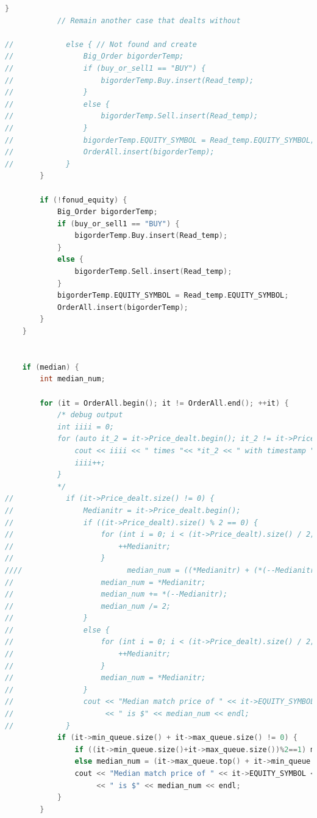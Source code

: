 \documentclass{article}
\begin{document}
\begin{lstlisting}[language=C++]
            }
            // Remain another case that dealts without

//            else { // Not found and create
//                Big_Order bigorderTemp;
//                if (buy_or_sell1 == "BUY") {
//                    bigorderTemp.Buy.insert(Read_temp);
//                }
//                else {
//                    bigorderTemp.Sell.insert(Read_temp);
//                }
//                bigorderTemp.EQUITY_SYMBOL = Read_temp.EQUITY_SYMBOL;
//                OrderAll.insert(bigorderTemp);
//            }
        }

        if (!fonud_equity) {
            Big_Order bigorderTemp;
            if (buy_or_sell1 == "BUY") {
                bigorderTemp.Buy.insert(Read_temp);
            }
            else {
                bigorderTemp.Sell.insert(Read_temp);
            }
            bigorderTemp.EQUITY_SYMBOL = Read_temp.EQUITY_SYMBOL;
            OrderAll.insert(bigorderTemp);
        }
    }


    if (median) {
        int median_num;

        for (it = OrderAll.begin(); it != OrderAll.end(); ++it) {
            /* debug output
            int iiii = 0;
            for (auto it_2 = it->Price_dealt.begin(); it_2 != it->Price_dealt.end(); it_2++) {
                cout << iiii << " times "<< *it_2 << " with timestamp " << timestamp << endl;
                iiii++;
            }
            */
//            if (it->Price_dealt.size() != 0) {
//                Medianitr = it->Price_dealt.begin();
//                if ((it->Price_dealt).size() % 2 == 0) {
//                    for (int i = 0; i < (it->Price_dealt).size() / 2; i++) {
//                        ++Medianitr;
//                    }
////                        median_num = ((*Medianitr) + (*(--Medianitr))) / 2;
//                    median_num = *Medianitr;
//                    median_num += *(--Medianitr);
//                    median_num /= 2;
//                }
//                else {
//                    for (int i = 0; i < (it->Price_dealt).size() / 2; i++) {
//                        ++Medianitr;
//                    }
//                    median_num = *Medianitr;
//                }
//                cout << "Median match price of " << it->EQUITY_SYMBOL << " at time " << current_timestamp
//                     << " is $" << median_num << endl;
//            }
            if (it->min_queue.size() + it->max_queue.size() != 0) {
                if ((it->min_queue.size()+it->max_queue.size())%2==1) median_num = it->max_queue.top();
                else median_num = (it->max_queue.top() + it->min_queue.top())/2;
                cout << "Median match price of " << it->EQUITY_SYMBOL << " at time " << current_timestamp
                     << " is $" << median_num << endl;
            }
        }


\end{lstlisting}
\end{document}
